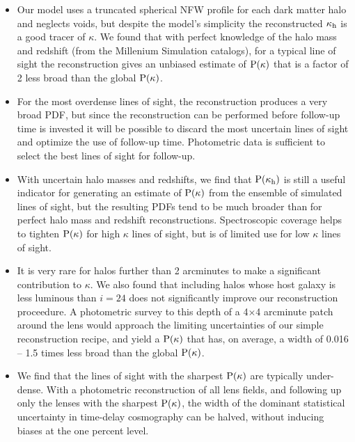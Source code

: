 \documentclass[useAMS,usenatbib]{mn2e}
\begin{document}
\begin{itemize} 

\item Our model uses a truncated spherical NFW profile for
each dark matter halo and neglects voids, but despite the model's simplicity
the reconstructed $\kappa_{\rm h}$ is a good tracer of $\kappa$.  We found that
with perfect knowledge of the halo mass and redshift (from the Millenium
Simulation catalogs), for a typical line of sight the reconstruction
gives an unbiased estimate of ${\rm P}(\kappa)$ that is a factor of 2
less broad than the global ${\rm P}(\kappa)$.

\item  For the most overdense lines of sight, the reconstruction produces a
very broad PDF, but since the reconstruction can be performed before follow-up
time is invested it will be possible to discard the most uncertain lines of
sight and optimize the use of follow-up time. Photometric data is sufficient 
to select the best lines of sight for follow-up.

\item With uncertain halo masses and redshifts, we find that
${\rm P}(\kappa_{\rm h})$ is still a useful indicator for generating an estimate
of ${\rm P}(\kappa)$ from the ensemble of simulated lines of sight, but the resulting
PDFs tend to be much broader than for perfect
halo mass and redshift reconstructions. Spectroscopic coverage helps to tighten 
${\rm P}(\kappa)$ for high $\kappa$ lines of sight, but is of limited use for 
low $\kappa$ lines of sight.

\item It is very rare for halos further than 2 arcminutes to make a
significant contribution to $\kappa$. We also found that including halos
whose host galaxy is less luminous than $i=24$ does not significantly improve
our reconstruction proceedure. A photometric survey to this depth of a
4$\times$4 arcminute patch around the lens would approach the limiting
uncertainties of our simple reconstruction recipe, and yield a 
${\rm P}(\kappa)$ that has, on average, a width of 0.016 --
1.5 times less broad than the global ${\rm P}(\kappa)$.

\item We find that the lines of sight with the sharpest ${\rm P}(\kappa)$ are
typically under-dense. With a photometric reconstruction of all lens fields,
and following up only the lenses with the sharpest ${\rm P}(\kappa)$,
the width of the dominant statistical uncertainty in time-delay cosmography
can be halved, without inducing biases at the one percent level.

\end{itemize}
\end{document}
